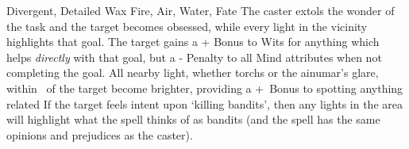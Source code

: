   {Divergent, Detailed}%
  {Wax}%
  {Fire, Air, Water, Fate}%
  {}%
  {The caster extols the wonder of the task and the target becomes obsessed, while every light in the vicinity highlights that goal.
  The target gains a + Bonus to Wits for anything which helps \emph{directly} with that goal, but a - Penalty to all Mind \glspl{attribute} when not completing the goal.
  All nearby light, whether \glspl{torch} or the \gls{ainumar}'s glare, within \spellRange\ of the target become brighter, providing a +~Bonus to spotting anything related}%
  {
    If the target feels intent upon `killing bandits', then any lights in the area will highlight what the spell thinks of as bandits (and the spell has the same opinions and prejudices as the caster).
  }


